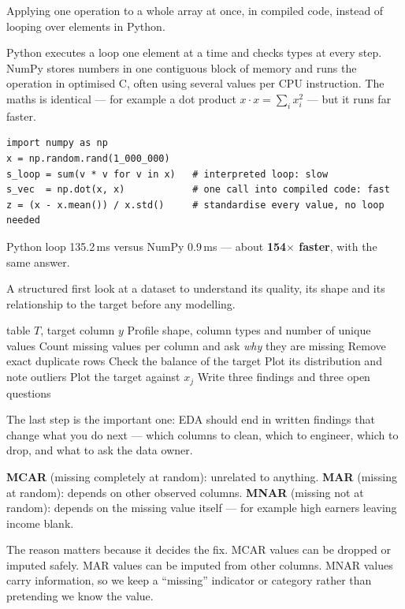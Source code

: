 \documentclass[11pt,a4paper]{article}
\begin{document}
\begin{bdef}[Vectorisation]
Applying one operation to a whole array at once, in compiled code, instead of looping over elements in Python.
\end{bdef}
Python executes a loop one element at a time and checks types at every step. NumPy stores numbers in one contiguous block of memory and runs the operation in optimised C, often using several values per CPU instruction. The maths is identical --- for example a dot product $x\cdot x=\sum_i x_i^2$ --- but it runs far faster.
\begin{bcode}
\begin{lstlisting}
import numpy as np
x = np.random.rand(1_000_000)
s_loop = sum(v * v for v in x)   # interpreted loop: slow
s_vec  = np.dot(x, x)            # one call into compiled code: fast
z = (x - x.mean()) / x.std()     # standardise every value, no loop needed
\end{lstlisting}
\end{bcode}
\begin{bres}
Python loop 135.2\,ms versus NumPy 0.9\,ms --- about \textbf{154$\times$ faster}, with the same answer.
\end{bres}

\begin{bdef}
A structured first look at a dataset to understand its quality, its shape and its relationship to the target before any modelling.
\end{bdef}
\begin{balgo}
\begin{algorithmic}[1]
\Require table $T$, target column $y$
\State Profile shape, column types and number of unique values
\State Count missing values per column and ask \emph{why} they are missing
\State Remove exact duplicate rows
\State Check the balance of the target
  \State Plot its distribution and note outliers
  \State Plot the target against $x_j$
\EndFor
\State Write three findings and three open questions
\end{algorithmic}
\end{balgo}
The last step is the important one: EDA should end in written findings that change what you do next --- which columns to clean, which to engineer, which to drop, and what to ask the data owner.

\begin{bdef}
\textbf{MCAR} (missing completely at random): unrelated to anything. \textbf{MAR} (missing at random): depends on other observed columns. \textbf{MNAR} (missing not at random): depends on the missing value itself --- for example high earners leaving income blank.
\end{bdef}
The reason matters because it decides the fix. MCAR values can be dropped or imputed safely. MAR values can be imputed from other columns. MNAR values carry information, so we keep a ``missing'' indicator or category rather than pretending we know the value.
\end{document}
